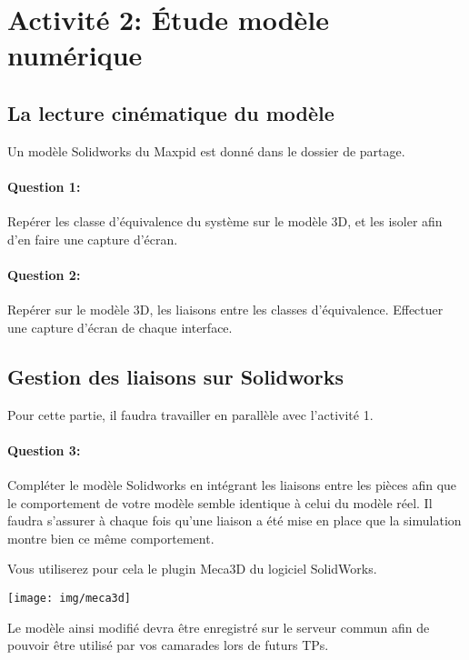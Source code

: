 \section{Activité 2: Étude modèle numérique}

\subsection{La lecture cinématique du modèle}

Un modèle Solidworks du Maxpid est donné dans le dossier de partage.

\paragraph{Question 1:} Repérer les classe d'équivalence du système sur le modèle 3D, et les isoler afin d'en faire une capture d'écran.

\paragraph{Question 2:} Repérer sur le modèle 3D, les liaisons entre les classes d'équivalence. Effectuer une capture d'écran de chaque interface.

\subsection{Gestion des liaisons sur Solidworks}

Pour cette partie, il faudra travailler en parallèle avec l'activité 1.

\paragraph{Question 3:} Compléter le modèle Solidworks en intégrant les liaisons entre les pièces afin que le comportement de votre modèle semble identique à celui du modèle réel. Il faudra s'assurer à chaque fois qu'une liaison a été mise en place que la simulation montre bien ce même comportement.

\begin{minipage}{0.45\linewidth}
Vous utiliserez pour cela le plugin Meca3D du logiciel SolidWorks.
\end{minipage}
\hfill
\begin{minipage}{0.5\linewidth}
\texttt{[image: img/meca3d]}
\end{minipage}

Le modèle ainsi modifié devra être enregistré sur le serveur commun afin de pouvoir être utilisé par vos camarades lors de futurs TPs.

